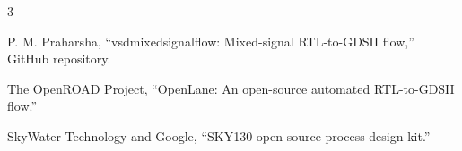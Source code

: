 \documentclass[conference]{IEEEtran}
\begin{document}
\vspace{-0.8em}
\begin{thebibliography}{3}
\setlength{\itemsep}{1pt}

P. M. Praharsha, ``vsdmixedsignalflow: Mixed-signal RTL-to-GDSII flow,'' GitHub repository.

The OpenROAD Project, ``OpenLane: An open-source automated RTL-to-GDSII flow.''

SkyWater Technology and Google, ``SKY130 open-source process design kit.''

\end{thebibliography}
\end{document}
